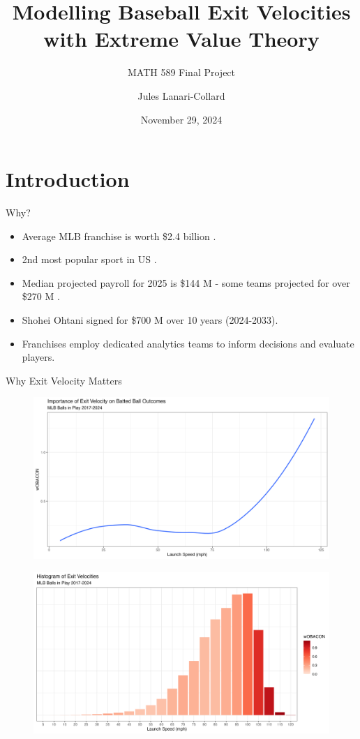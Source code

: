 \documentclass{beamer}
\title{Modelling Baseball Exit Velocities with Extreme Value Theory}
\subtitle{MATH 589 Final Project}
\author{Jules Lanari-Collard}
\institute{McGill University}
\date{November 29, 2024}
\begin{document}
\frame{\titlepage}
\section{Introduction}

\begin{frame}{Why?}
\begin{itemize}
    \item Average MLB franchise is worth \$2.4 billion \cite{forbesValuations}.
    \item 2nd most popular sport in US \cite{gallupPoll}.
    \item Median projected payroll for 2025 is \$144 M - some teams projected for over \$270 M \cite{fgRosterResource}.
    \item Shohei Ohtani signed for \$700 M over 10 years (2024-2033).
    \item Franchises employ dedicated analytics teams to inform decisions and evaluate players.
\end{itemize}
\end{frame}

\begin{frame}[allowframebreaks]{Why Exit Velocity Matters}
    \begin{figure}
        \centering
        \includegraphics[width=\linewidth]{plots/ev_woba.png}
        \label{fig:ev-woba}
    \end{figure}
    \begin{figure}
        \centering
        \includegraphics[width=\linewidth]{plots/evHistogram.png}
        \label{fig:ev-histogram}
    \end{figure}
\end{frame}
\end{document}
